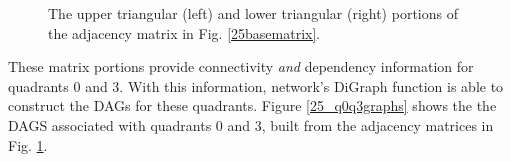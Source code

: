 \begin{figure}[H]
\begin{minipage}[c]{0.5\textwidth}
\centering
{}
\end{minipage}
\begin{minipage}[c]{0.5\textwidth}
\centering
{}
\end{minipage}
\caption{The upper triangular (left) and lower triangular (right) portions of the adjacency matrix in Fig. \ref{25basematrix}.}
\label{25baseportionmatrices}
\end{figure}
These matrix portions provide connectivity \textit{and} dependency information for quadrants 0 and 3. 
With this information, network's DiGraph function is able to construct the DAGs for these quadrants. 
Figure \ref{25_q0q3graphs} shows the the DAGS associated with quadrants 0 and 3, built from the adjacency matrices in Fig. \ref{25baseportionmatrices}.

